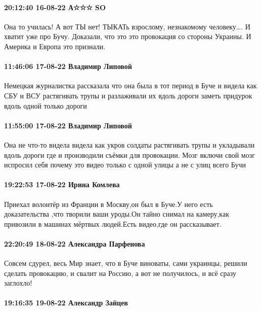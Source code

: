 \paragraph{20:12:40 16-08-22 А☆☆☆ SO}

Она то училась! А вот ТЫ нет! ТЫКАТь взрослому, незнакомому человеку…. И хватит
уже про Бучу. Доказали, что это это провокация со стороны Украины. И Америка и
Европа это признали.

\paragraph{11:46:06 17-08-22 Владимир Липовой}

Немецкая журналистка рассказала что она была в тот период в Буче и видела как
СБУ и ВСУ растягивать трупы и разлаживали их вдоль дороги заметь придурок вдоль
одной только дороги

\paragraph{11:55:00 17-08-22 Владимир Липовой}

Она не что-то видела видела как укров солдаты растягивать трупы и укладывали
вдоль дороги где и производили съёмки для провокации. Мозг включи свой мозг
испросил себя почему это видео только с одной улицы а не с улиц всего Бучи

\paragraph{19:22:53 17-08-22 Ирина Комлева}

Приехал волонтёр из Франции в Москву,он был в Буче.У него есть доказательства
,что творили ваши уроды.Он тайно снимал на камеру,как привозили в машинах
мёртвых людей.Есть видео,где он рассказывает.

\paragraph{22:20:49 18-08-22 Александра Парфенова}

Совсем сдурел, весь Мир знает, что в Буче виноваты, сами украинцы, решили
сделать провокацию, и свалит на Россию, а вот не получилось, и всё сразу
заглохло!

\paragraph{19:16:35 19-08-22 Александр Зайцев}

